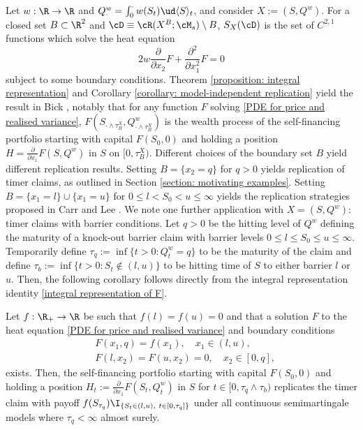 \documentclass[11pt]{article}
\begin{document}
Let $w: \R \rightarrow \R$ and $Q^w_\cdot = \int_0^\cdot w(S_t) \ud \langle S \rangle_t$, and consider $X := (S,Q^w)$. For a closed set $B \subset \R^2$ and $\cD \equiv \cR(X^B; \cM_s) \setminus B$, $S_X(\cD)$ is the set of $C^{2,1}$ functions which solve the heat equation
\begin{equation}
\label{PDE for price and realised variance}
2 w \frac{\partial}{\partial x_2} F + \frac{\partial^2}{\partial x_1^2} F = 0
\end{equation}
subject to some boundary conditions. Theorem \ref{proposition: integral representation} and Corollary \ref{corollary: model-independent replication} yield the result in Bick \cite{Bick}, notably that for any function $F$ solving \eqref{PDE for price and realised variance}, $F( S_{\cdot \wedge \tau^X_B}, Q^w_{\cdot \wedge \tau^X_B} )$ is the wealth process of the self-financing portfolio starting with capital $F(S_0,0)$ and holding a position $H = \frac{\partial}{\partial x_1} F(S,Q^w)$ in $S$ on $[0,\tau^X_B)$. Different choices of the boundary set $B$ yield different replication results. Setting $B =  \{x_2 = q\}$ for $q > 0$ yields replication of timer claims, as outlined in Section \ref{section: motivating examples}. Setting $B = \{x_1 = l\} \cup \{x_1 = u\}$ for $0 \leq l < S_0 < u \leq \infty$ yields the replication strategies proposed in Carr and Lee \cite{Carr-Lee:semimartingales}. We note one further application with $X = (S, Q^w)$: timer claims with barrier conditions. Let $q > 0$ be the hitting level of $Q^w$ defining the maturity of a knock-out barrier claim with barrier levels $0 \leq l \leq S_0 \leq u \leq \infty$. Temporarily define $\tau_q := \inf\{ t > 0: Q^w_t = q\}$ to be the maturity of the claim and define $\tau_b := \inf\{ t > 0: S_t \not\in (l,u) \}$ to be hitting time of $S$ to either barrier $l$ or $u$. Then, the following corollary follows directly from the integral representation identity \eqref{integral representation of F}.

\begin{corollary}
\label{corollary: barrier claims}
Let $f: \R_+ \to \R$ be such that $f(l) = f(u) = 0$ and that a solution $F$ to the heat equation \eqref{PDE for price and realised variance} and boundary conditions
\begin{align}
&F(x_1, q) = f(x_1), \quad x_1 \in (l,u), \label{boundary condition at maturity} \\
&F(l, x_2) = F(u, x_2) = 0, \quad x_2 \in [0,q], \label{boundary condition at barrier}
\end{align}
exists. Then, the self-financing portfolio starting with capital $F(S_0,0)$ and holding a position $H_t := \frac{\partial}{\partial x_1} F(S_t,Q^w_t)$ in $S$ for $t \in [0,\tau_q \wedge \tau_b)$ replicates the timer claim with payoff $f(S_{\tau_q}) \I_{\{ S_t \in (l, u), \ t \in [0,\tau_q] \}}$ under all continuous semimartingale models where $\tau_q < \infty$ almost surely.
\end{corollary}
\end{document}
